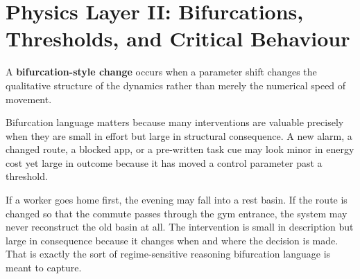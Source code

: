 \section{Physics Layer II: Bifurcations, Thresholds, and Critical Behaviour}

\begin{definition}
A \textbf{bifurcation-style change} occurs when a parameter shift changes the
qualitative structure of the dynamics rather than merely the numerical speed of
movement.
\end{definition}

Bifurcation language matters because many interventions are valuable precisely
when they are small in effort but large in structural consequence. A new alarm,
a changed route, a blocked app, or a pre-written task cue may look minor in
energy cost yet large in outcome because it has moved a control parameter past a
threshold.

\begin{example}
If a worker goes home first, the evening may fall into a rest basin. If the
route is changed so that the commute passes through the gym entrance, the
system may never reconstruct the old basin at all. The intervention is small in
description but large in consequence because it changes when and where the
decision is made. That is exactly the sort of regime-sensitive reasoning
bifurcation language is meant to capture.
\end{example}
